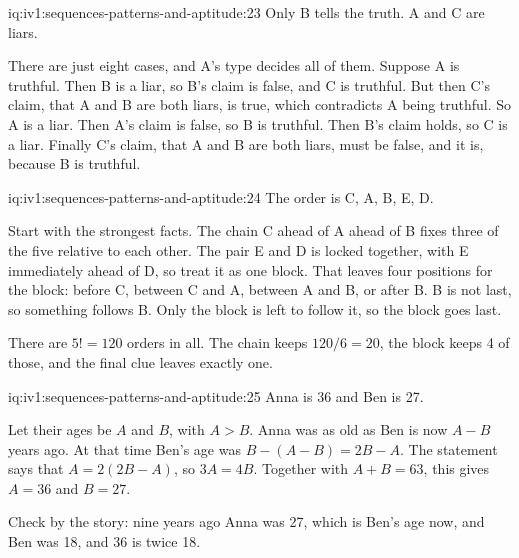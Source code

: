 \begin{solution}{iq:iv1:sequences-patterns-and-aptitude:23}
Only B tells the truth. A and C are liars.

There are just eight cases, and A's type decides all of them. Suppose A is truthful. Then B is a liar, so B's claim is false, and C is truthful. But then C's claim, that A and B are both liars, is true, which contradicts A being truthful. So A is a liar. Then A's claim is false, so B is truthful. Then B's claim holds, so C is a liar. Finally C's claim, that A and B are both liars, must be false, and it is, because B is truthful.

\end{solution}

\begin{solution}{iq:iv1:sequences-patterns-and-aptitude:24}
The order is C, A, B, E, D.

Start with the strongest facts. The chain C ahead of A ahead of B fixes three of the five relative to each other. The pair E and D is locked together, with E immediately ahead of D, so treat it as one block. That leaves four positions for the block: before C, between C and A, between A and B, or after B. B is not last, so something follows B. Only the block is left to follow it, so the block goes last.

There are $5! = 120$ orders in all. The chain keeps $120/6 = 20$, the block keeps 4 of those, and the final clue leaves exactly one.

\end{solution}

\begin{solution}{iq:iv1:sequences-patterns-and-aptitude:25}
Anna is 36 and Ben is 27.

Let their ages be $A$ and $B$, with $A > B$. Anna was as old as Ben is now $A - B$ years ago. At that time Ben's age was $B - (A - B) = 2B - A$. The statement says that $A = 2(2B - A)$, so $3A = 4B$. Together with $A + B = 63$, this gives $A = 36$ and $B = 27$.

Check by the story: nine years ago Anna was 27, which is Ben's age now, and Ben was 18, and 36 is twice 18.

\end{solution}

